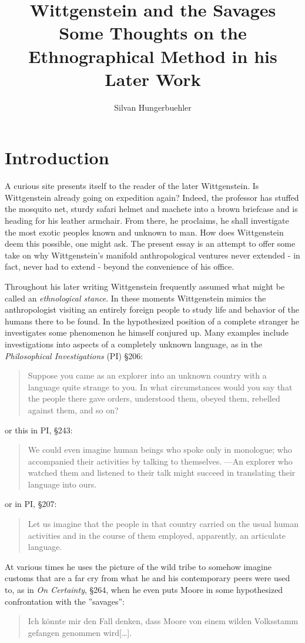 \documentclass{article}
\title{Wittgenstein and the Savages\\
\large Some Thoughts on the Ethnographical Method in his Later Work}
\date{}
\author{Silvan Hungerbuehler}
\begin{document}
\maketitle
\section{Introduction}
A curious site presents itself to the reader of the later Wittgenstein. Is Wittgenstein already going on expedition again? Indeed, the professor has stuffed the mosquito net, sturdy safari helmet and machete into a brown briefcase and is heading for his leather armchair. From there, he proclaims, he shall investigate the most exotic peoples known and unknown to man. How does Wittgenstein deem this possible, one might ask. The present essay is an attempt to offer some take on why Wittgenstein's manifold anthropological ventures never extended - in fact, never had to extend - beyond the convenience of his office. 

Throughout his later writing Wittgenstein frequently assumed what might be called an \textit{ethnological stance}. In these moments Wittgenstein mimics the anthropologist visiting an entirely foreign people to study life and behavior of the humans there to be found. In the hypothesized position of a complete stranger he investigates some phenomenon he himself conjured up. Many examples include investigations into aspects of a completely unknown language, as in the \textit{Philosophical Investigations} (PI) §206:
\begin{quote}
Suppose you came as an explorer into an unknown country with a
language quite strange to you. In what circumstances would you
say that the people there gave orders, understood them, obeyed them,
rebelled against them, and so on?
\end{quote}
or this in PI, §243:
\begin{quote}
We could even imagine human beings who spoke only in monologue; who accompanied their activities by talking to themselves. —An explorer who watched them and listened to their talk might succeed in translating their language into ours.
\end{quote}
or in PI, §207: 
\begin{quote}
Let us imagine that the people in that country carried on the usual human activities and in the course of them employed, apparently, an articulate language.\end{quote}
 At various times he uses the picture of the wild tribe to somehow imagine customs that are a far cry from what he and his contemporary peers were used to, as in \textit{On Certainty}, §264, when he even puts Moore in some hypothesized confrontation with the ''savages'':
 \begin{quote}
Ich könnte mir den Fall denken, dass Moore von einem wilden Volksstamm gefangen genommen wird[…].
\end{quote}
\end{document}
